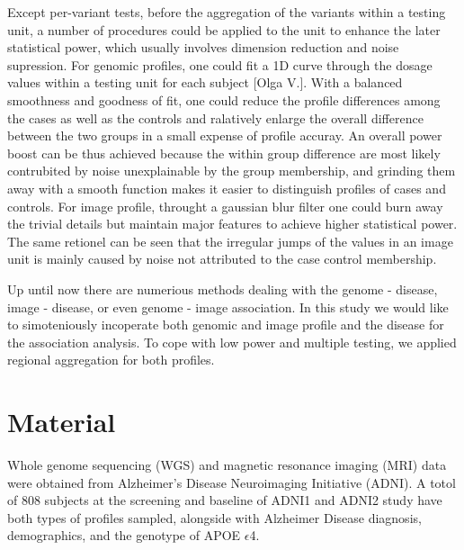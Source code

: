 \documentclass[twocolumn]{article}
\begin{document}
Except per-variant tests, before the aggregation of the variants within a testing unit, a number of procedures could be applied to the unit to enhance the later statistical power, which usually involves dimension reduction and noise supression. For genomic profiles, one could fit a 1D curve through the dosage values within a testing unit for each subject [Olga V.]. With a balanced smoothness and goodness of fit, one could reduce the profile differences among the cases as well as the controls and ralatively enlarge the overall difference between the two groups in a small expense of profile accuray. An overall power boost can be thus achieved because the within group difference are most likely contrubited by noise unexplainable by the group membership, and grinding them away with a smooth function makes it easier to distinguish profiles of cases and controls. For image profile, throught a gaussian blur filter one could burn away the trivial details but maintain major features to achieve higher statistical power. The same retionel can be seen that the irregular jumps of the values in an image unit is mainly caused by noise not attributed to the case control membership. 

Up until now there are numerious methods dealing with the genome - disease, image - disease, or even genome - image association. In this study we would like to simoteniously incoperate both genomic and image profile and the disease for the association analysis. To cope with low power and multiple testing, we applied regional aggregation for both profiles.

\section{Material}
Whole genome sequencing (WGS) and magnetic resonance imaging (MRI) data were obtained from Alzheimer’s Disease Neuroimaging Initiative (ADNI). A totol of 808 subjects at the screening and baseline of ADNI1 and ADNI2 study have both types of profiles sampled, alongside with Alzheimer Disease diagnosis, demographics, and the genotype of APOE $\epsilon$4.
\end{document}
